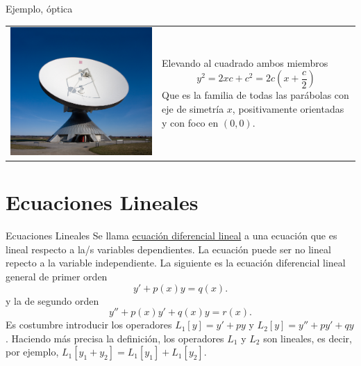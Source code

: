 \documentclass[handout,hyperref={colorlinks=true}]{beamer}
\begin{document}
\begin{frame}{Ejemplo, óptica}
 \begin{tabular}{m{4cm} m{5cm}}
 \includegraphics[scale=.15]{imagenes/antena.jpg} & Elevando al cuadrado ambos miembros
\[y^2=2xc+c^2=2c\left(x+\frac{c}{2}\right)\]
Que es la familia de todas las parábolas con eje de simetría $x$, positivamente orientadas y con foco en $(0,0)$. \\
 \end{tabular}
 \end{frame}
\section[Lineales]{Ecuaciones Lineales}

\begin{frame}{Ecuaciones Lineales}
Se llama \href{http://es.wikipedia.org/wiki/Ecuación_diferencial_lineal}{ecuación diferencial lineal} a una ecuación que es lineal
respecto a   la/s variables
dependientes. La ecuación puede ser no lineal repecto a la variable independiente. 
La siguiente es la ecuación diferencial lineal general de primer orden
\begin{equation}\label{eq:lineal}y'+p(x)y=q(x).
\end{equation}
y la  de segundo orden
\[y''+p(x)y'+q(x)y=r(x).\]
Es costumbre introducir los operadores  $L_1[y]=y'+py$  y $ L_2[y]=y''+py'+qy$. 
Haciendo más precisa la definición, los operadores $L_1$ y $L_2$ son lineales, es decir, por ejemplo, $L_1[y_1+y_2]=L_1[y_1]+L_1[y_2]$. 
\end{frame}
\end{document}

